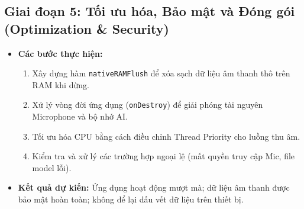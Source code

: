 \documentclass[12pt,a4paper]{article}
\begin{document}
\subsection{Giai đoạn 5: Tối ưu hóa, Bảo mật và Đóng gói (Optimization \& Security)}
\begin{itemize}
    \item \textbf{Các bước thực hiện:}
    \begin{enumerate}
        \item Xây dựng hàm \texttt{nativeRAMFlush} để xóa sạch dữ liệu âm thanh thô trên RAM khi dừng.
        \item Xử lý vòng đời ứng dụng (\texttt{onDestroy}) để giải phóng tài nguyên Microphone và bộ nhớ AI.
        \item Tối ưu hóa CPU bằng cách điều chỉnh Thread Priority cho luồng thu âm.
        \item Kiểm tra và xử lý các trường hợp ngoại lệ (mất quyền truy cập Mic, file model lỗi).
    \end{enumerate}
    \item \textbf{Kết quả dự kiến:} Ứng dụng hoạt động mượt mà; dữ liệu âm thanh được bảo mật hoàn toàn; không để lại dấu vết dữ liệu trên thiết bị.
\end{itemize}
\end{document}
